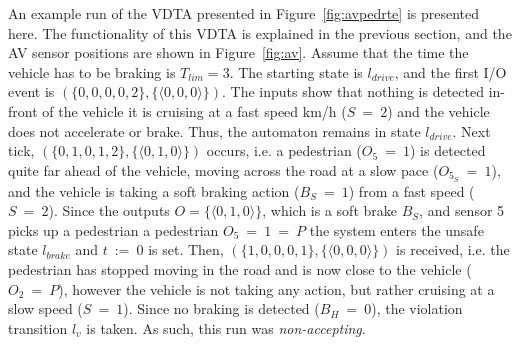 

\begin{example}
	\label{ex:run}
	An example run of the VDTA presented in Figure~\ref{fig:avpedrte} is presented here.
	The functionality of this \ac{VDTA} is explained in the previous section, and the \ac{AV} sensor positions are shown in Figure~\ref{fig:av}.
	Assume that the time the vehicle has to be braking is $T_{lim} = 3$. 
	The starting state is $l_{drive}$, and the first I/O event is $(\{0, 0, 0, 0, 2\}, \{\langle 0, 0, 0 \rangle\})$.
	The inputs show that nothing is detected in-front of the vehicle it is cruising at a fast speed km/h ($S~=~2$) and the vehicle does not accelerate or brake.
	Thus, the automaton remains in state $l_{drive}$.
	Next tick, $(\{0, 1, 0, 1, 2\}, \{\langle 0, 1, 0 \rangle\})$ occurs, i.e. a pedestrian ($O_5~=~1$) is detected quite far ahead of the vehicle, moving across the road at a slow pace ($O_{5_S}~=~1$), and the vehicle is taking a soft braking action ($B_S~=~1$) from a fast speed ($S~=~2$).
	Since the outputs ${O} = \{\langle 0, 1, 0 \rangle\}$, which is a soft brake $B_S$, and sensor 5 picks up a pedestrian a pedestrian $O_5~=~1~=~P$ the system enters the unsafe state $l_{brake}$ and $t~:=~0$ is set.
	Then,  $(\{1, 0, 0, 0, 1\}, \{\langle 0, 0, 0 \rangle\})$ is received, i.e. the pedestrian has stopped moving in the road and is now close to the vehicle ($O_2~=~P$), however the vehicle is not taking any action, but rather cruising at a slow speed ($S~=~1$).
	Since no braking is detected ($B_H~=~0$), the violation transition $l_v$ is taken.
	As such, this run was \textit{non-accepting}.
\end{example}

